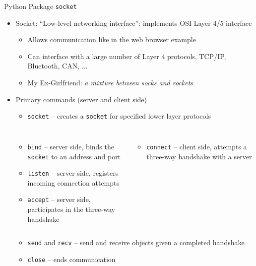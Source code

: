 \begin{frame}{Python Package \texttt{socket}}
%
\begin{itemize}
\item Socket: \enquote{Low-level networking interface}: implements OSI Layer 4/5 interface
	\begin{itemize}
	\item Allows communication like in the web browser example
	\item Can interface with a large number of Layer 4 protocols, \zB TCP/IP, Bluetooth, CAN, ...
	\item My Ex-Girlfriend: \emph{a mixture between socks and rockets}
	\end{itemize}
\pause
\item Primary commands (server and client side)
	\begin{itemize}
		\item \texttt{socket} -- creates a \texttt{socket} for specified lower layer protocols
	\end{itemize}
	\vspace{-18pt}
	\begin{columns}[t]
	\begin{itemize}
		\item \texttt{bind} -- server side, binds the \texttt{socket} to an address and port
		\item \texttt{listen} -- server side, registers incoming connection attempts
		\item \texttt{accept} -- server side, participates in the three-way handshake
	\end{itemize}
	\begin{itemize}
		\item \texttt{connect} -- client side, attempts a three-way handshake with a server
	\end{itemize}
	\end{columns}
	\begin{itemize}
		\item \texttt{send} and \texttt{recv} -- send and receive  objects given a completed handshake
		\item \texttt{close} -- ends communication
	\end{itemize}
\end{itemize}
%
\end{frame}


